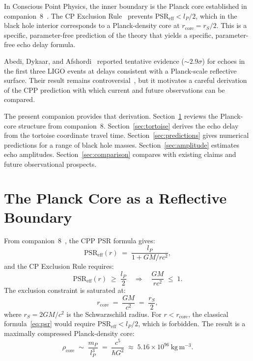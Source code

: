 \documentclass[12pt]{article}
\newcommand{\lP}{l_P}
\newcommand{\mP}{m_P}
\newcommand{\rS}{r_S}
\newcommand{\rcore}{r_{\mathrm{core}}}
\newcommand{\PSR}{\mathrm{PSR}}
\begin{document}
In Conscious Point Physics, the inner boundary is the Planck core
established in companion~8~\cite{c8}.  The CP Exclusion Rule~\cite{c1}
prevents $\PSR_{\mathrm{eff}} < \lP/2$, which in the black hole interior
corresponds to a Planck-density core at $\rcore = \rS/2$.  This is a
specific, parameter-free prediction of the theory that yields a specific,
parameter-free echo delay formula.

Abedi, Dykaar, and Afshordi~\cite{abedi2016} reported tentative evidence
($\sim\!2.9\sigma$) for echoes in the first three LIGO events at delays
consistent with a Planck-scale reflective surface.  Their result remains
controversial~\cite{westerweck2018, conti2024}, but it motivates a careful
derivation of the CPP prediction with which current and future observations
can be compared.

The present companion provides that derivation.  Section~\ref{sec:mechanism}
reviews the Planck-core structure from companion~8.
Section~\ref{sec:tortoise} derives the echo delay from the tortoise
coordinate travel time.  Section~\ref{sec:predictions} gives numerical
predictions for a range of black hole masses.  Section~\ref{sec:amplitude}
estimates echo amplitudes.  Section~\ref{sec:comparison} compares with
existing claims and future observational prospects.

\section{The Planck Core as a Reflective Boundary}
\label{sec:mechanism}

From companion~8~\cite{c8}, the CPP PSR formula gives:
\begin{equation}
  \PSR_{\mathrm{eff}}(r) \;=\; \frac{\lP}{1 + GM/rc^2},
  \label{eq:psr}
\end{equation}
and the CP Exclusion Rule requires:
\begin{equation}
  \PSR_{\mathrm{eff}}(r) \;\geq\; \frac{\lP}{2}
  \quad \Longrightarrow \quad
  \frac{GM}{rc^2} \;\leq\; 1.
  \label{eq:exclusion}
\end{equation}
The exclusion constraint is saturated at:
\begin{equation}
  \rcore \;=\; \frac{GM}{c^2} \;=\; \frac{\rS}{2},
  \label{eq:rcore}
\end{equation}
where $\rS = 2GM/c^2$ is the Schwarzschild radius.  For $r < \rcore$,
the classical formula~\eqref{eq:psr} would require
$\PSR_{\mathrm{eff}} < \lP/2$, which is forbidden.  The result is a
maximally compressed Planck-density core:
\begin{equation}
  \rho_{\mathrm{core}} \;\sim\; \frac{\mP}{\lP^3}
  \;=\; \frac{c^5}{\hbar G^2}
  \;\approx\; 5.16\times 10^{96}\ \mathrm{kg\,m^{-3}}.
  \label{eq:rho_core}
\end{equation}
\end{document}
